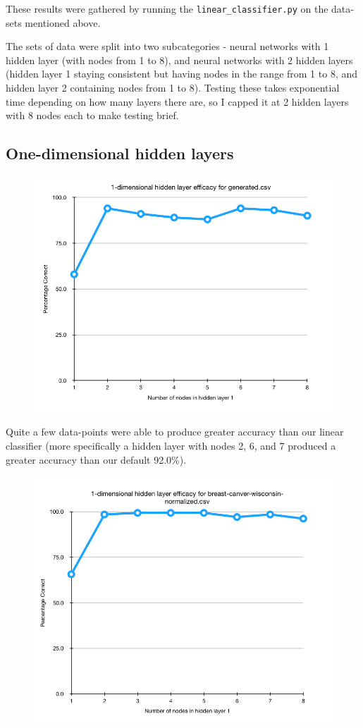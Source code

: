 \documentclass[12pt]{extarticle}
\begin{document}
These results were gathered by running the \verb$linear_classifier.py$ on the data-sets mentioned above.

The sets of data were split into two subcategories - neural networks with 1 hidden layer (with nodes from 1 to 8), and neural networks with 2 hidden layers (hidden layer 1 staying consistent but having nodes in the range from 1 to 8, and hidden layer 2 containing nodes from 1 to 8). Testing these takes exponential time depending on how many layers there are, so I capped it at 2 hidden layers with 8 nodes each to make testing brief.

\subsection{One-dimensional hidden layers}

\begin{figure}[H]
\centering
\includegraphics[width=0.6\linewidth]{generated-1d}
\end{figure}

Quite a few data-points were able to produce greater accuracy than our linear classifier (more specifically a hidden layer with nodes 2, 6, and 7 produced a greater accuracy than our default 92.0\%).

\begin{figure}[H]
\centering
\includegraphics[width=0.6\linewidth]{breast-1d}
\end{figure}
\end{document}
